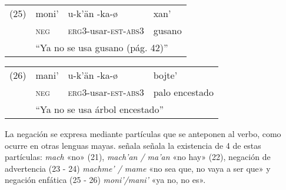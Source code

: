 {%
\begin{tabular}{llll}
(25) & moni' & u-k'än -ka-ø & xan' \\
& \textsc{neg} & \textsc{erg3}-usar-\textsc{est-abs3} & gusano \\
& \multicolumn{3}{l}{``Ya no se usa gusano (pág. 42)''}\\
\end{tabular} \vspace{0.3cm}

\begin{tabular}{llll}
(26) & mani' & u-k'än -ka-ø & bojte' \\
& \textsc{neg} & \textsc{erg3}-usar-\textsc{est-abs3} & palo encestado \\
 & \multicolumn{3}{l}{``Ya no se usa árbol encestado''} \\
\end{tabular} \vspace{0.5cm}
}

La negación se expresa mediante partículas que se anteponen al verbo, como ocurre en otras lenguas mayas. \textcolor{MidnightBlue}{\citet{ChontalTabasco}} señala señala la existencia de 4 de estas partículas: \textit{mach} «no» (21), \textit{mach'an / ma'an} «no hay» (22), negación de advertencia (23 - 24) \textit{machme' / mame} «no sea que, no vaya a ser que» y negación enfática (25 - 26) \textit{moni'/mani'} «ya no, no es».
